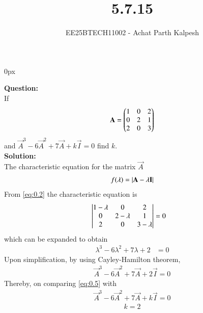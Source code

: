 \documentclass[journal]{IEEEtran}
\begin{document}

\title{5.7.15}
\author{EE25BTECH11002 - Achat Parth Kalpesh }
{\let\newpage\relax\maketitle}
\renewcommand{\thefigure}{\theenumi}
\renewcommand{\thetable}{\theenumi}
\setlength{\intextsep}{10pt} %
\renewcommand{\thetable}{\theenumi}
\parindent 0px



\textbf{Question:}\\
If 
\begin{align}
\mathbf{A} = \begin{pmatrix}1 & 0 & 2 \\ 0 & 2 & 1 \\ 2 & 0 & 3\end{pmatrix}
\end{align} 
and $\vec{A}^3-6\vec{A}^2+7\vec{A}+k\vec{I}=0$ find $k$.\\
\textbf{Solution:}\\
The characteristic equation for the matrix $\vec{A}$
\begin{align}
\label{eq:0.2}
        f(\lambda) = \left\vert\mathbf{A} - \lambda \mathbf{I}\right\vert
\end{align}
From \eqref{eq:0.2} the characteristic equation is
\begin{align}
\begin{vmatrix}1 -\lambda & 0 & 2 \\ 0 & 2 -\lambda & 1 \\ 2 & 0 & 3-\lambda\end{vmatrix} &= 0
\end{align}
which can be expanded to obtain
\begin{align} 
\lambda^3 - 6\lambda^2 + 7\lambda + 2 &= 0 
 \end{align} 
 Upon simplification, by using Cayley-Hamilton theorem,
 \begin{align}
 \label{eq:0.5}
     \vec{A}^3-6\vec{A}^2+7\vec{A}+2\vec{I}=0
 \end{align}
 Thereby, on comparing \eqref{eq:0.5} with
 \begin{align}
     \vec{A}^3-6\vec{A}^2+7\vec{A}+k\vec{I}=0
 \end{align}
 \begin{align}
     k=2
 \end{align}
\end{document}
